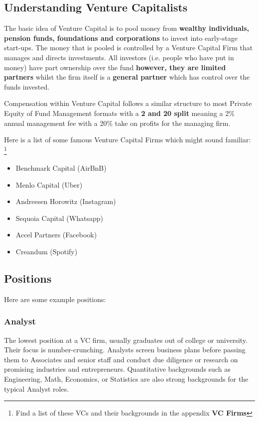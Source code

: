 \documentclass[a4paper]{article}
\begin{document}
{\subsection{Understanding Venture Capitalists}
The basic idea of Venture Capital is to pool money from \textbf{wealthy individuals, pension funds, foundations and corporations} to invest into early-stage start-ups. The money that is pooled is controlled by a Venture Capital Firm that manages and directs investments. All investors (i.e. people who have put in money) have part ownership over the fund \textbf{however, they are limited partners} whilst the firm itself is a \textbf{general partner} which has control over the funds invested.

\vspace{5pt}
\noindent Compensation within Venture Capital follows a similar structure to most Private Equity of Fund Management formats with a \textbf{2 and 20 split} meaning a 2\% annual management fee with a 20\% take on profits for the managing firm.

\vspace{5pt}
\noindent Here is a list of some famous Venture Capital Firms which might sound familiar: \footnote{Find a list of these VCs and their backgrounds in the appendix \textbf{VC Firms}}
\begin{itemize}
	\item Benchmark Capital (AirBnB)
	\item Menlo Capital (Uber)
	\item Andreesen Horowitz (Instagram)
	\item Sequoia Capital (Whatsapp)
	\item Accel Partners (Facebook)
	\item Creandum (Spotify)
\end{itemize}

\subsection{Positions}
Here are some example positions:

\subsubsection{Analyst}
The lowest position at a VC firm, usually graduates out of college or university. Their focus is number-crunching. Analysts screen business plans before passing them to Associates and senior staff and conduct due diligence or research on promising industries and entrepreneurs. Quantitative backgrounds such as Engineering, Math, Economics, or Statistics are also strong backgrounds for the typical Analyst roles.

}
\end{document}
